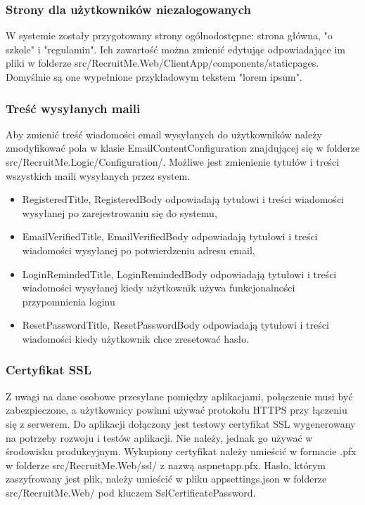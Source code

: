 \documentclass{article}
\begin{document}
\subsubsection{Strony dla użytkowników niezalogowanych}
W systemie zostały przygotowany strony ogólnodostępne: strona główna, \linebreak
"o szkole" i "regulamin". Ich zawartość można zmienić edytując odpowiadające im pliki w folderze src/RecruitMe.Web/ClientApp/components/staticpages.\linebreak
Domyślnie są one wypełnione przykładowym tekstem "lorem ipsum".
\subsubsection{Treść wysyłanych maili}
Aby zmienić treść wiadomości email wysyłanych do użytkowników należy zmodyfikować pola w klasie EmailContentConfiguration znajdującej się w folderze src/RecruitMe.Logic/Configuration/. Możliwe jest zmienienie tytułów i treści wszystkich maili wysyłanych przez system.
\begin{itemize}
    \item RegisteredTitle, RegisteredBody odpowiadają tytułowi i treści wiadomości wysyłanej po zarejestrowaniu się do systemu,
    \item EmailVerifiedTitle, EmailVerifiedBody odpowiadają tytułowi i treści wiadomości wysyłanej po potwierdzeniu adresu email,
    \item LoginRemindedTitle, LoginRemindedBody odpowiadają tytułowi i treści wiadomości wysyłanej kiedy użytkownik używa funkcjonalności przypomnienia loginu
    \item ResetPasswordTitle, ResetPasswordBody odpowiadają tytułowi i treści wiadomości kiedy użytkownik chce zresetować hasło.
\end{itemize}
\subsubsection{Certyfikat SSL}
Z uwagi na dane osobowe przesyłane pomiędzy aplikacjami, połączenie musi być zabezpieczone, a użytkownicy powinni używać protokołu HTTPS przy łączeniu się z serwerem. Do aplikacji dołączony jest testowy certyfikat SSL wygenerowany na potrzeby rozwoju i testów aplikacji. Nie należy, jednak go używać w środowisku produkcyjnym. Wykupiony certyfikat należy umieścić w formacie .pfx w folderze  src/RecruitMe.Web/ssl/ z nazwą aspnetapp.pfx. Hasło, którym zaszyfrowany jest plik, należy umieścić w pliku appsettings.json w folderze src/RecruitMe.Web/ pod kluczem SslCertificatePassword. 
\end{document}
